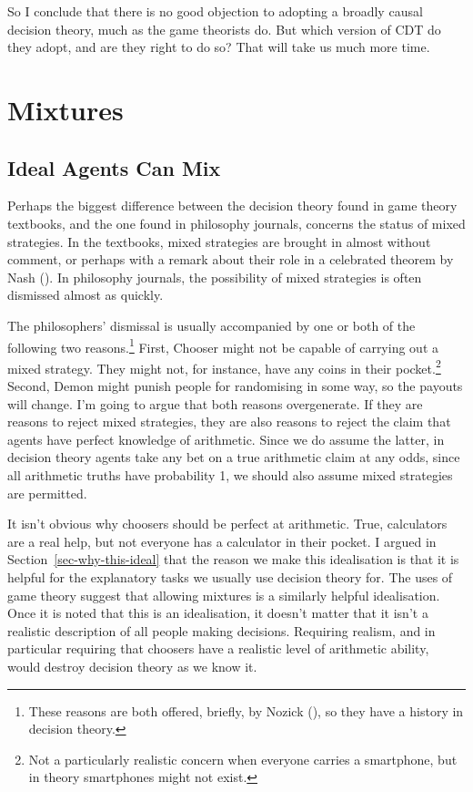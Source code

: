 \documentclass[
  12pt,
  letterpaper,
  DIV=11,
  numbers=noendperiod]{scrreprt}
\begin{document}
So I conclude that there is no good objection to adopting a broadly
causal decision theory, much as the game theorists do. But which version
of CDT do they adopt, and are they right to do so? That will take us
much more time.


\chapter{Mixtures}\label{sec-mixed}

\section{Ideal Agents Can Mix}\label{ideal-agents-can-mix}

Perhaps the biggest difference between the decision theory found in game
theory textbooks, and the one found in philosophy journals, concerns the
status of mixed strategies. In the textbooks, mixed strategies are
brought in almost without comment, or perhaps with a remark about their
role in a celebrated theorem by Nash (). In
philosophy journals, the possibility of mixed strategies is often
dismissed almost as quickly.

The philosophers' dismissal is usually accompanied by one or both of the
following two reasons.\footnote{These reasons are both offered, briefly,
  by Nozick (), so they have a history in
  decision theory.} First, Chooser might not be capable of carrying out
a mixed strategy. They might not, for instance, have any coins in their
pocket.\footnote{Not a particularly realistic concern when everyone
  carries a smartphone, but in theory smartphones might not exist.}
Second, Demon might punish people for randomising in some way, so the
payouts will change. I'm going to argue that both reasons overgenerate.
If they are reasons to reject mixed strategies, they are also reasons to
reject the claim that agents have perfect knowledge of arithmetic. Since
we do assume the latter, in decision theory agents take any bet on a
true arithmetic claim at any odds, since all arithmetic truths have
probability 1, we should also assume mixed strategies are permitted.

It isn't obvious why choosers should be perfect at arithmetic. True,
calculators are a real help, but not everyone has a calculator in their
pocket. I argued in Section~\ref{sec-why-this-ideal} that the reason we
make this idealisation is that it is helpful for the explanatory tasks
we usually use decision theory for. The uses of game theory suggest that
allowing mixtures is a similarly helpful idealisation. Once it is noted
that this is an idealisation, it doesn't matter that it isn't a
realistic description of all people making decisions. Requiring realism,
and in particular requiring that choosers have a realistic level of
arithmetic ability, would destroy decision theory as we know it.
\end{document}
